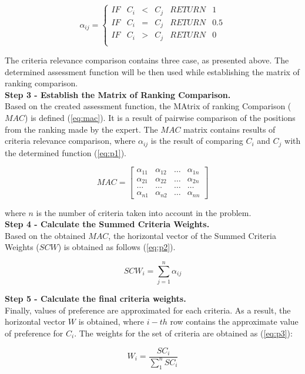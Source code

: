 \begin{equation}
    \alpha_{ij} = \left\{ \begin{array}{lccccr}
        IF & C_{i} &  < & C_{j} & RETURN & 1  \\
        IF & C_{i} & = & C_{j} & RETURN & 0.5 \\
        IF & C_{i} & > &  C_{j} & RETURN & 0  \\
    \end{array}
    \right.
    \label{eq:p1}
\end{equation}

The criteria relevance comparison contains three case, as presented above. The determined assessment function will be then used while establishing the matrix of ranking comparison.  \\

\noindent \textbf{Step 3 - Establish the Matrix of Ranking Comparison.} \\

Based on the created assessment function, the MAtrix of ranking Comparison ($MAC$) is defined (\ref{eq:mac}). It is a result of pairwise comparison of the positions from the ranking made by the expert. The $MAC$ matrix contains results of criteria relevance comparison, where $\alpha_{ij}$ is the result of comparing $C_i$ and $C_j$ with the determined function (\ref{eq:p1}).

\begin{equation}
    M A C=\left[\begin{array}{cccc}
    \alpha_{11} & \alpha_{12} & \ldots & \alpha_{1 n} \\
    \alpha_{21} & \alpha_{22} & \ldots & \alpha_{2 n} \\
    \ldots & \ldots & \ldots & \ldots \\
    \alpha_{n 1} & \alpha_{n 2} & \ldots & \alpha_{n n}
\end{array}\right]
\label{eq:mac}
\end{equation}

where $n$ is the number of criteria taken into account in the problem. \\


\noindent \textbf{Step 4 - Calculate the Summed Criteria Weights.} \\

Based on the obtained $MAC$, the horizontal vector of the Summed Criteria Weights ($SCW$) is obtained as follows (\ref{eq:p2}).

\begin{equation}
SCW_i=\sum^{n}_{j=1}\alpha_{ij}
\label{eq:p2}
\end{equation}

\noindent \textbf{Step 5 - Calculate the final criteria weights.} \\

Finally, values of preference are approximated for each criteria. As a result, the horizontal vector $W$ is obtained, where $i-th$ row contains the approximate value of preference for $C_i$. The weights for the set of criteria are obtained as (\ref{eq:p3}):

\begin{equation}
    W_{i} = \frac{SC_{i}}{\sum_{1}^{n} SC_{i}}
\label{eq:p3}
\end{equation}
